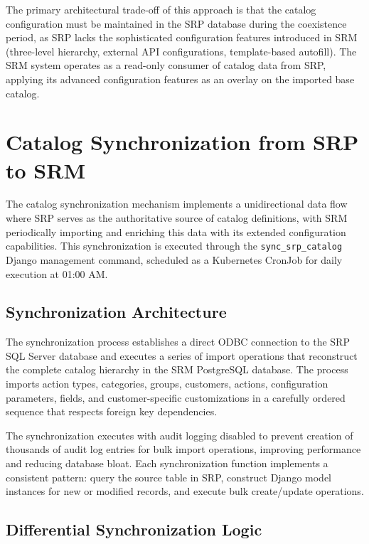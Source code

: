 The primary architectural trade-off of this approach is that the catalog configuration must be maintained in the SRP database during the coexistence period, as SRP lacks the sophisticated configuration features introduced in SRM (three-level hierarchy, external API configurations, template-based autofill). The SRM system operates as a read-only consumer of catalog data from SRP, applying its advanced configuration features as an overlay on the imported base catalog.

\section{Catalog Synchronization from SRP to SRM}

The catalog synchronization mechanism implements a unidirectional data flow where SRP serves as the authoritative source of catalog definitions, with SRM periodically importing and enriching this data with its extended configuration capabilities. This synchronization is executed through the \texttt{sync\_srp\_catalog} Django management command, scheduled as a Kubernetes CronJob for daily execution at 01:00 AM.

\subsection{Synchronization Architecture}

The synchronization process establishes a direct ODBC connection to the SRP SQL Server database and executes a series of import operations that reconstruct the complete catalog hierarchy in the SRM PostgreSQL database. The process imports action types, categories, groups, customers, actions, configuration parameters, fields, and customer-specific customizations in a carefully ordered sequence that respects foreign key dependencies.

The synchronization executes with audit logging disabled to prevent creation of thousands of audit log entries for bulk import operations, improving performance and reducing database bloat. Each synchronization function implements a consistent pattern: query the source table in SRP, construct Django model instances for new or modified records, and execute bulk create/update operations.

\subsection{Differential Synchronization Logic}

